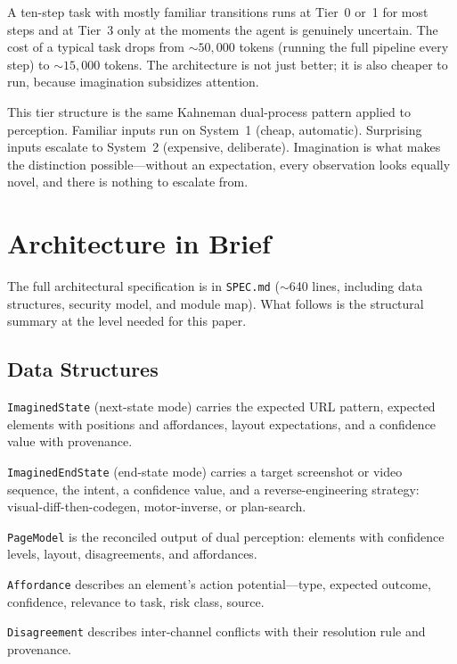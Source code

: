 \documentclass[12pt]{article}
\theoremstyle{definition}
\theoremstyle{remark}
\begin{document}
A ten-step task with mostly familiar transitions runs at Tier~0 or~1
for most steps and at Tier~3 only at the moments the agent is
genuinely uncertain. The cost of a typical task drops from
$\sim 50{,}000$ tokens (running the full pipeline every step) to
$\sim 15{,}000$ tokens. The architecture is not just better; it is also
cheaper to run, because imagination subsidizes attention.

This tier structure is the same Kahneman dual-process pattern applied
to perception. Familiar inputs run on System~1 (cheap, automatic).
Surprising inputs escalate to System~2 (expensive, deliberate).
Imagination is what makes the distinction possible---without an
expectation, every observation looks equally novel, and there is
nothing to escalate from.

\section{Architecture in Brief}
\label{sec:architecture}

The full architectural specification is in \texttt{SPEC.md}
($\sim$640 lines, including data structures, security model, and
module map). What follows is the structural summary at the level
needed for this paper.

\subsection{Data Structures}

\texttt{ImaginedState} (next-state mode) carries the expected URL
pattern, expected elements with positions and affordances, layout
expectations, and a confidence value with provenance.

\texttt{ImaginedEndState} (end-state mode) carries a target screenshot
or video sequence, the intent, a confidence value, and a
reverse-engineering strategy: visual-diff-then-codegen, motor-inverse,
or plan-search.

\texttt{PageModel} is the reconciled output of dual perception:
elements with confidence levels, layout, disagreements, and
affordances.

\texttt{Affordance} describes an element's action potential---type,
expected outcome, confidence, relevance to task, risk class, source.

\texttt{Disagreement} describes inter-channel conflicts with their
resolution rule and provenance.
\end{document}
